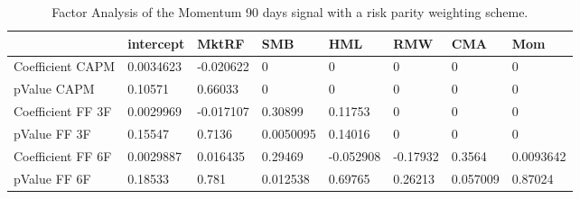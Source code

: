\begin{table}[H]
\centering
\begin{tabular}{llllllll}
& intercept & MktRF & SMB & HML & RMW & CMA & Mom \\ 
\hline 
Coefficient CAPM & 0.0034623 & -0.020622 & 0 & 0 & 0 & 0 & 0 \\ 
pValue CAPM & 0.10571 & 0.66033 & 0 & 0 & 0 & 0 & 0 \\ 
Coefficient FF 3F & 0.0029969 & -0.017107 & 0.30899 & 0.11753 & 0 & 0 & 0 \\ 
pValue FF 3F & 0.15547 & 0.7136 & 0.0050095 & 0.14016 & 0 & 0 & 0 \\ 
Coefficient FF 6F & 0.0029887 & 0.016435 & 0.29469 & -0.052908 & -0.17932 & 0.3564 & 0.0093642 \\ 
pValue FF 6F & 0.18533 & 0.781 & 0.012538 & 0.69765 & 0.26213 & 0.057009 & 0.87024 \\ 
\hline
\end{tabular}
\caption{Factor Analysis of the Momentum 90 days signal with a risk parity weighting scheme.}
\label{MOM90RP_FACTOR}
\end{table}